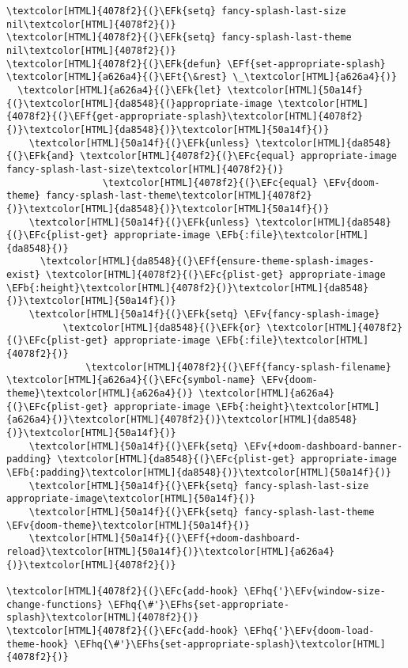 \documentclass{scrartcl}
\newcommand{\EFk}[1]{\textcolor{EFk}{#1}} %
\newcommand{\EFt}[1]{\textcolor{EFt}{#1}} %
\newcommand{\EFb}[1]{\textcolor{EFb}{#1}} %
\newcommand{\EFc}[1]{\textcolor{EFc}{#1}} %
\newcommand{\EFv}[1]{\textcolor{EFv}{#1}} %
\newcommand{\EFf}[1]{\textcolor{EFf}{#1}} %
\newcommand{\EFhq}[1]{\textcolor{EFhq}{#1}} %
\newcommand{\EFhs}[1]{\textcolor{EFhs}{#1}} %
\begin{document}
\begin{Code}
\begin{Verbatim}[]
\textcolor[HTML]{4078f2}{(}\EFk{setq} fancy-splash-last-size nil\textcolor[HTML]{4078f2}{)}
\textcolor[HTML]{4078f2}{(}\EFk{setq} fancy-splash-last-theme nil\textcolor[HTML]{4078f2}{)}
\textcolor[HTML]{4078f2}{(}\EFk{defun} \EFf{set-appropriate-splash} \textcolor[HTML]{a626a4}{(}\EFt{\&rest} \_\textcolor[HTML]{a626a4}{)}
  \textcolor[HTML]{a626a4}{(}\EFk{let} \textcolor[HTML]{50a14f}{(}\textcolor[HTML]{da8548}{(}appropriate-image \textcolor[HTML]{4078f2}{(}\EFf{get-appropriate-splash}\textcolor[HTML]{4078f2}{)}\textcolor[HTML]{da8548}{)}\textcolor[HTML]{50a14f}{)}
    \textcolor[HTML]{50a14f}{(}\EFk{unless} \textcolor[HTML]{da8548}{(}\EFk{and} \textcolor[HTML]{4078f2}{(}\EFc{equal} appropriate-image fancy-splash-last-size\textcolor[HTML]{4078f2}{)}
                 \textcolor[HTML]{4078f2}{(}\EFc{equal} \EFv{doom-theme} fancy-splash-last-theme\textcolor[HTML]{4078f2}{)}\textcolor[HTML]{da8548}{)}\textcolor[HTML]{50a14f}{)}
    \textcolor[HTML]{50a14f}{(}\EFk{unless} \textcolor[HTML]{da8548}{(}\EFc{plist-get} appropriate-image \EFb{:file}\textcolor[HTML]{da8548}{)}
      \textcolor[HTML]{da8548}{(}\EFf{ensure-theme-splash-images-exist} \textcolor[HTML]{4078f2}{(}\EFc{plist-get} appropriate-image \EFb{:height}\textcolor[HTML]{4078f2}{)}\textcolor[HTML]{da8548}{)}\textcolor[HTML]{50a14f}{)}
    \textcolor[HTML]{50a14f}{(}\EFk{setq} \EFv{fancy-splash-image}
          \textcolor[HTML]{da8548}{(}\EFk{or} \textcolor[HTML]{4078f2}{(}\EFc{plist-get} appropriate-image \EFb{:file}\textcolor[HTML]{4078f2}{)}
              \textcolor[HTML]{4078f2}{(}\EFf{fancy-splash-filename} \textcolor[HTML]{a626a4}{(}\EFc{symbol-name} \EFv{doom-theme}\textcolor[HTML]{a626a4}{)} \textcolor[HTML]{a626a4}{(}\EFc{plist-get} appropriate-image \EFb{:height}\textcolor[HTML]{a626a4}{)}\textcolor[HTML]{4078f2}{)}\textcolor[HTML]{da8548}{)}\textcolor[HTML]{50a14f}{)}
    \textcolor[HTML]{50a14f}{(}\EFk{setq} \EFv{+doom-dashboard-banner-padding} \textcolor[HTML]{da8548}{(}\EFc{plist-get} appropriate-image \EFb{:padding}\textcolor[HTML]{da8548}{)}\textcolor[HTML]{50a14f}{)}
    \textcolor[HTML]{50a14f}{(}\EFk{setq} fancy-splash-last-size appropriate-image\textcolor[HTML]{50a14f}{)}
    \textcolor[HTML]{50a14f}{(}\EFk{setq} fancy-splash-last-theme \EFv{doom-theme}\textcolor[HTML]{50a14f}{)}
    \textcolor[HTML]{50a14f}{(}\EFf{+doom-dashboard-reload}\textcolor[HTML]{50a14f}{)}\textcolor[HTML]{a626a4}{)}\textcolor[HTML]{4078f2}{)}

\textcolor[HTML]{4078f2}{(}\EFc{add-hook} \EFhq{'}\EFv{window-size-change-functions} \EFhq{\#'}\EFhs{set-appropriate-splash}\textcolor[HTML]{4078f2}{)}
\textcolor[HTML]{4078f2}{(}\EFc{add-hook} \EFhq{'}\EFv{doom-load-theme-hook} \EFhq{\#'}\EFhs{set-appropriate-splash}\textcolor[HTML]{4078f2}{)}
\end{Verbatim}
\end{Code}
\end{document}

